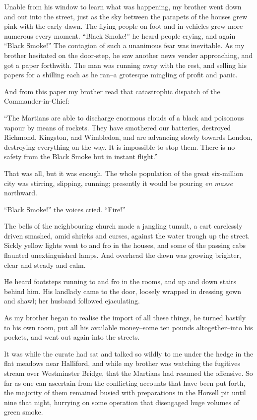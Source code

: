 Unable from his window to learn what was happening, my brother went
down and out into the street, just as the sky between the parapets
of the houses grew pink with the early dawn. The flying people on
foot and in vehicles grew more numerous every moment. ``Black
Smoke!'' he heard people crying, and again ``Black Smoke!'' The
contagion of such a unanimous fear was inevitable. As my brother
hesitated on the door-step, he saw another news vender approaching,
and got a paper forthwith. The man was running away with the rest,
and selling his papers for a shilling each as he ran--a grotesque
mingling of profit and panic.

And from this paper my brother read that catastrophic dispatch of
the Commander-in-Chief:

``The Martians are able to discharge enormous clouds of a black and
poisonous vapour by means of rockets. They have smothered our
batteries, destroyed Richmond, Kingston, and Wimbledon, and are
advancing slowly towards London, destroying everything on the way.
It is impossible to stop them. There is no safety from the Black
Smoke but in instant flight.''

That was all, but it was enough. The whole population of the great
six-million city was stirring, slipping, running; presently it
would be pouring \emph{en masse} northward.

``Black Smoke!'' the voices cried. ``Fire!''

The bells of the neighbouring church made a jangling tumult, a cart
carelessly driven smashed, amid shrieks and curses, against the
water trough up the street. Sickly yellow lights went to and fro in
the houses, and some of the passing cabs flaunted unextinguished
lamps. And overhead the dawn was growing brighter, clear and steady
and calm.

He heard footsteps running to and fro in the rooms, and up and down
stairs behind him. His landlady came to the door, loosely wrapped
in dressing gown and shawl; her husband followed ejaculating.

As my brother began to realise the import of all these things, he
turned hastily to his own room, put all his available money--some
ten pounds altogether--into his pockets, and went out again into
the streets.

It was while the curate had sat and talked so wildly to me under
the hedge in the flat meadows near Halliford, and while my brother
was watching the fugitives stream over Westminster Bridge, that the
Martians had resumed the offensive. So far as one can ascertain
from the conflicting accounts that have been put forth, the
majority of them remained busied with preparations in the Horsell
pit until nine that night, hurrying on some operation that
disengaged huge volumes of green smoke.

